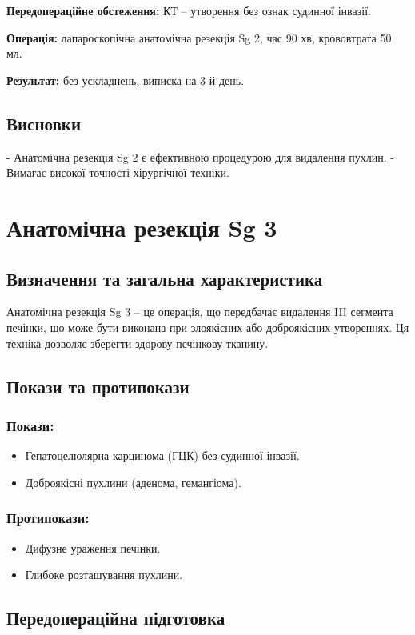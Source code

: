 \begin{refsection}
\textbf{Передопераційне обстеження:} КТ – утворення без ознак судинної інвазії.

\textbf{Операція:} лапароскопічна анатомічна резекція Sg 2, час 90 хв, крововтрата 50 мл.

\textbf{Результат:} без ускладнень, виписка на 3-й день.

\subsection{Висновки}
- Анатомічна резекція Sg 2 є ефективною процедурою для видалення пухлин.
- Вимагає високої точності хірургічної техніки.

\section{Анатомічна резекція Sg 3}
\subsection{Визначення та загальна характеристика}
Анатомічна резекція Sg 3 – це операція, що передбачає видалення III сегмента печінки, що може бути виконана при злоякісних або доброякісних утвореннях. Ця техніка дозволяє зберегти здорову печінкову тканину.

\subsection{Покази та протипокази}
\subsubsection{Покази:}
\begin{itemize}
    \item Гепатоцелюлярна карцинома (ГЦК) без судинної інвазії.
    \item Доброякісні пухлини (аденома, гемангіома).
\end{itemize}

\subsubsection{Протипокази:}
\begin{itemize}
    \item Дифузне ураження печінки.
    \item Глибоке розташування пухлини.
\end{itemize}

\subsection{Передопераційна підготовка}

\end{refsection}
